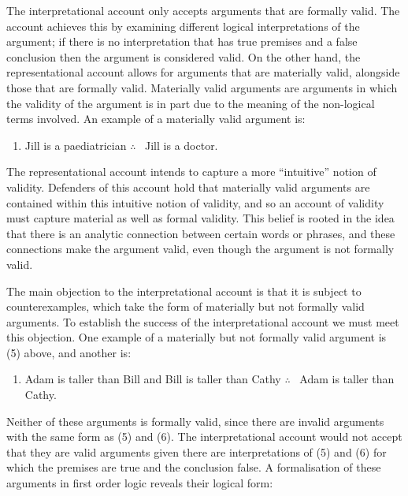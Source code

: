 The interpretational account only accepts arguments that are formally
valid. The account achieves this by examining different logical
interpretations of the argument; if there is no interpretation that has
true premises and a false conclusion then the argument is considered
valid. On the other hand, the representational account allows for
arguments that are materially valid, alongside those that are formally
valid. Materially valid arguments are arguments in which the validity of
the argument is in part due to the meaning of the non-logical terms
involved. An example of a materially valid argument is:

\begin{enumerate}[leftmargin=42pt] 
\def\labelenumi{(\arabic{enumi})}
\setcounter{enumi}{4}
\item
  Jill is a paediatrician $\therefore$ \ Jill is a doctor.
\end{enumerate}

\noindent The representational account intends to capture a more ``intuitive''
notion of validity. Defenders of this account hold that materially valid
arguments are contained within this intuitive notion of validity, and so
an account of validity must capture material as well as formal validity.
This belief is rooted in the idea that there is an analytic connection
between certain words or phrases, and these connections make the
argument valid, even though the argument is not formally valid.

The main objection to the interpretational account is that it is subject
to counterexamples, which take the form of materially but not formally
valid arguments. To establish the success of the interpretational
account we must meet this objection. One example of a materially but not
formally valid argument is (5) above, and another is:

\begin{enumerate}[leftmargin=42pt] 
\def\labelenumi{(\arabic{enumi})}
\setcounter{enumi}{5}
\item
  Adam is taller than Bill and Bill is taller than Cathy $\therefore$ \ Adam is
taller than Cathy. 
\end{enumerate}

\noindent Neither of these arguments is formally valid, since there are invalid
arguments with the same form as (5) and (6). The interpretational
account would not accept that they are valid arguments given there are
interpretations of (5) and (6) for which the premises are true and the
conclusion false. A formalisation of these arguments in first order
logic reveals their logical form:

